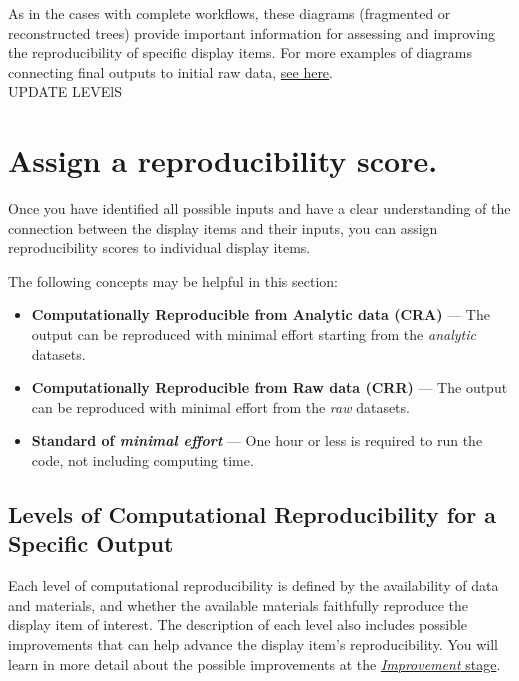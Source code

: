 \documentclass[
]{book}
\begin{document}
As in the cases with complete workflows, these diagrams (fragmented or reconstructed trees) provide important information for assessing and improving the reproducibility of specific display items. For more examples of diagrams connecting final outputs to initial raw data, \protect\hyperlink{examples-of-reproduction-trees}{see here}.\\
UPDATE LEVElS

\hypertarget{score}{%
\section{Assign a reproducibility score.}\label{score}}

Once you have identified all possible inputs and have a clear understanding of the connection between the display items and their inputs, you can assign reproducibility scores to individual display items.

The following concepts may be helpful in this section:

\begin{itemize}
\item
  \textbf{Computationally Reproducible from Analytic data (CRA)} --- The output can be reproduced with minimal effort starting from the \emph{analytic} datasets.
\item
  \textbf{Computationally Reproducible from Raw data (CRR)} --- The output can be reproduced with minimal effort from the \emph{raw} datasets.
\item
  \textbf{Standard of \emph{minimal effort}} --- One hour or less is required to run the code, not including computing time.
\end{itemize}

\hypertarget{levels-of-computational-reproducibility-for-a-specific-output}{%
\subsection{Levels of Computational Reproducibility for a Specific Output}\label{levels-of-computational-reproducibility-for-a-specific-output}}

Each level of computational reproducibility is defined by the availability of data and materials, and whether the available materials faithfully reproduce the display item of interest. The description of each level also includes possible improvements that can help advance the display item's reproducibility. You will learn in more detail about the possible improvements at the \href{https://bitss.github.io/ACRE/improvements.html}{\emph{Improvement} stage}.
\end{document}
